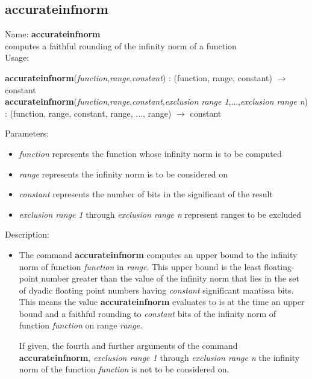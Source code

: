 \subsection{accurateinfnorm}
\label{labaccurateinfnorm}
\noindent Name: \textbf{accurateinfnorm}\\
computes a faithful rounding of the infinity norm of a function \\

\noindent Usage: 
\begin{center}
\textbf{accurateinfnorm}(\emph{function},\emph{range},\emph{constant}) : (\textsf{function}, \textsf{range}, \textsf{constant}) $\rightarrow$ \textsf{constant}\\
\textbf{accurateinfnorm}(\emph{function},\emph{range},\emph{constant},\emph{exclusion range 1},...,\emph{exclusion range n}) : (\textsf{function}, \textsf{range}, \textsf{constant}, \textsf{range}, ..., \textsf{range}) $\rightarrow$ \textsf{constant}\\
\end{center}
Parameters: 
\begin{itemize}
\item \emph{function} represents the function whose infinity norm is to be computed
\item \emph{range} represents the infinity norm is to be considered on
\item \emph{constant} represents the number of bits in the significant of the result
\item \emph{exclusion range 1} through \emph{exclusion range n} represent ranges to be excluded 
\end{itemize}
\noindent Description: \begin{itemize}

\item The command \textbf{accurateinfnorm} computes an upper bound to the infinity norm of
   function \emph{function} in \emph{range}. This upper bound is the least
   floating-point number greater than the value of the infinity norm that
   lies in the set of dyadic floating point numbers having \emph{constant}
   significant mantissa bits. This means the value \textbf{accurateinfnorm} evaluates to
   is at the time an upper bound and a faithful rounding to \emph{constant}
   bits of the infinity norm of function \emph{function} on range \emph{range}.
    
   If given, the fourth and further arguments of the command \textbf{accurateinfnorm},
   \emph{exclusion range 1} through \emph{exclusion range n} the infinity norm of
   the function \emph{function} is not to be considered on.
\end{itemize}
